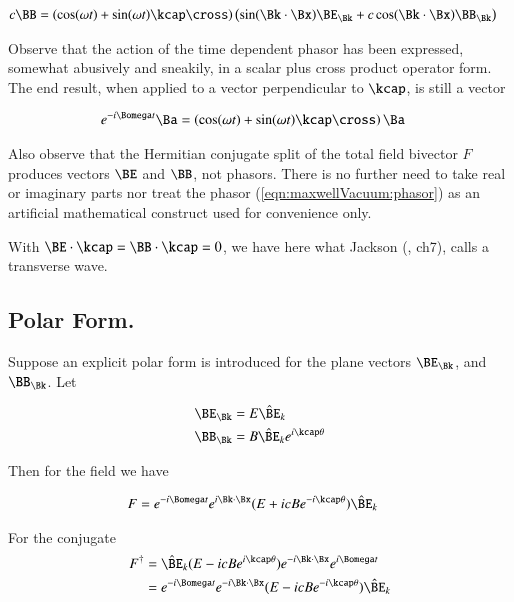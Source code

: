 \begin{align}\label{eqn:maxwellVacuum:magneticSplit}
c \BB &=
\left( \cos(\omega t) + \sin(\omega t) \kcap \cross \right)
\left(
 \sin(\Bk \cdot \Bx) \BE_\Bk
+ c \cos(\Bk \cdot \Bx) \BB_\Bk
\right)
\end{align}

Observe that the action of the time dependent phasor has been expressed, somewhat abusively and sneakily, in a scalar plus cross product operator form.  The end result, when applied to a vector perpendicular to $\kcap$, is still a vector

\begin{align*}
e^{-i\Bomega t} \Ba
&=
\left( \cos(\omega t) + \sin(\omega t) \kcap \cross \right) \Ba
\end{align*}

Also observe that the Hermitian conjugate split of the total field bivector $F$ produces vectors $\BE$ and $\BB$, not phasors.  There is no further need to take real or imaginary parts nor treat the phasor (\ref{eqn:maxwellVacuum:phasor}) as an artificial mathematical construct used for convenience only.

With $\BE \cdot \kcap = \BB \cdot \kcap = 0$, we have here what Jackson (\citep{jackson1975cew}, ch7), calls a transverse wave.

\subsection{Polar Form.}

Suppose an explicit polar form is introduced for the plane vectors $\BE_\Bk$, and $\BB_\Bk$.  Let

\begin{align*}
\BE_\Bk &= E {\hat{\BE}_k} \\
\BB_\Bk &= B {\hat{\BE}_k} e^{i\kcap \theta}
\end{align*}

Then for the field we have

\begin{align}\label{eqn:maxwellVacuum:phasorPolar}
F &= e^{-i\Bomega t} e^{i \Bk \cdot \Bx} (E + i c B e^{-i\kcap \theta}) \hat{\BE}_k
\end{align}

For the conjugate
\begin{align*}
F^\dagger
&=
\hat{\BE}_k
(E - i c B e^{i\kcap \theta})
e^{-i \Bk \cdot \Bx}
e^{i\Bomega t} \\
&=
e^{-i\Bomega t} e^{-i \Bk \cdot \Bx} (E - i c B e^{-i\kcap \theta}) \hat{\BE}_k
\end{align*}

